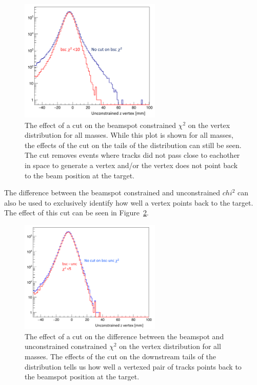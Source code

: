 \begin{figure}[H]
  \centering
      \includegraphics[width=0.6\textwidth]{pics/searching/bscCut.png}
  \caption{The effect of a cut on the beamspot constrained $\chi^2$ on the vertex distribution for all masses. While this plot is shown for all masses, the effects of the cut on the tails of the distribution can still be seen. The cut removes events where tracks did not pass close to eachother in space to generate a vertex and/or the vertex does not point back to the beam position at the target.}
  \label{fig:bsccut}
\end{figure} 

The difference between the beamspot constrained and unconstrained $chi^2$ can also be used to exclusively identify how well a vertex points back to the target. The effect of this cut can be seen in Figure~\ref{fig:bmucut}.

\begin{figure}[H]
  \centering
      \includegraphics[width=0.6\textwidth]{pics/searching/bmuchi2.png}
  \caption{The effect of a cut on the difference between the beamspot and unconstrained constrained $\chi^2$ on the vertex distribution for all masses. The effects of the cut on the downstream tails of the distribution tells us how well a vertexed pair of tracks points back to the beamspot position at the target.}
  \label{fig:bmucut}
\end{figure} 

